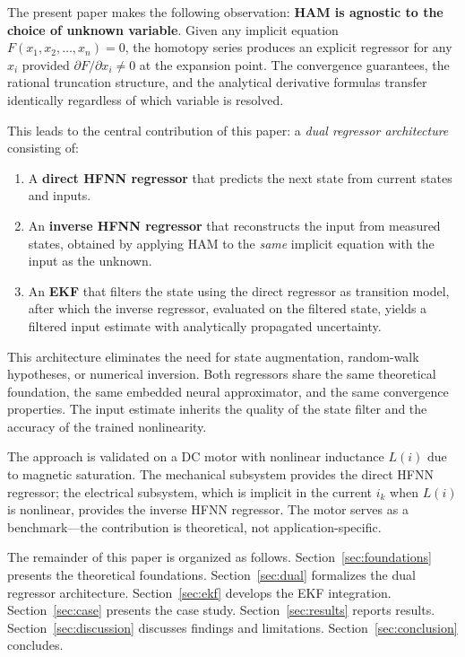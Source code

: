 \documentclass[lettersize,journal]{IEEEtran}
\begin{document}
The present paper makes the following observation: \textbf{HAM is agnostic to the choice of unknown variable}. Given any implicit equation $F(x_1, x_2, \ldots, x_n) = 0$, the homotopy series produces an explicit regressor for any $x_i$ provided $\partial F / \partial x_i \neq 0$ at the expansion point. The convergence guarantees, the rational truncation structure, and the analytical derivative formulas transfer identically regardless of which variable is resolved.

This leads to the central contribution of this paper: a \emph{dual regressor architecture} consisting of:
\begin{enumerate}
    \item A \textbf{direct HFNN regressor} that predicts the next state from current states and inputs.
    \item An \textbf{inverse HFNN regressor} that reconstructs the input from measured states, obtained by applying HAM to the \emph{same} implicit equation with the input as the unknown.
    \item An \textbf{EKF} that filters the state using the direct regressor as transition model, after which the inverse regressor, evaluated on the filtered state, yields a filtered input estimate with analytically propagated uncertainty.
\end{enumerate}

This architecture eliminates the need for state augmentation, random-walk hypotheses, or numerical inversion. Both regressors share the same theoretical foundation, the same embedded neural approximator, and the same convergence properties. The input estimate inherits the quality of the state filter and the accuracy of the trained nonlinearity.

The approach is validated on a DC motor with nonlinear inductance $L(i)$ due to magnetic saturation. The mechanical subsystem provides the direct HFNN regressor; the electrical subsystem, which is implicit in the current $i_k$ when $L(i)$ is nonlinear, provides the inverse HFNN regressor. The motor serves as a benchmark---the contribution is theoretical, not application-specific.

The remainder of this paper is organized as follows. Section~\ref{sec:foundations} presents the theoretical foundations. Section~\ref{sec:dual} formalizes the dual regressor architecture. Section~\ref{sec:ekf} develops the EKF integration. Section~\ref{sec:case} presents the case study. Section~\ref{sec:results} reports results. Section~\ref{sec:discussion} discusses findings and limitations. Section~\ref{sec:conclusion} concludes.
\end{document}
